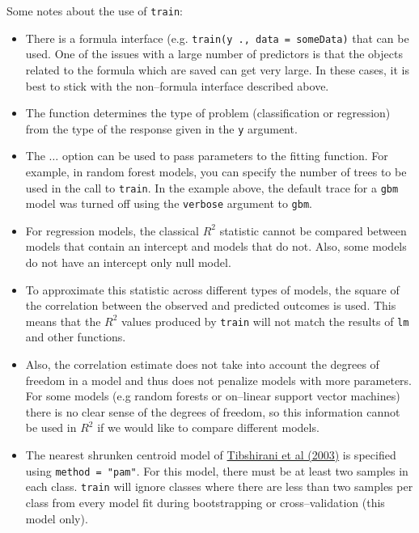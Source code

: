 \documentclass[12pt]{article}
\begin{document}
Some notes about the use of \texttt{train}:
\begin{itemize}
  
  \item There is a formula interface (e.g. \texttt{train(y~., data = someData)} that can be used. One of the issues with a large number of predictors is that the objects related to the formula which are saved can get very large. In these cases, it is best to stick with the non--formula interface described above.
	\item The function determines the type of problem (classification or regression) from the type of the response given in the \texttt{y} argument. 
	
	\item The \texttt{$\ldots$} option can be used to pass parameters to the fitting function. For example, in random forest models, you can specify the number of trees to be used in the call to \texttt{train}. In the example above, the default trace for a \texttt{gbm} model was turned off using the \texttt{verbose} argument to \texttt{gbm}.
	
	\item For regression models, the classical $R^2$ statistic cannot be compared between models that contain an intercept and models that do not. Also, some models do not have an intercept only null model.	
          
          \item [] To approximate this statistic across different types of models,  the square of the correlation between the observed and predicted outcomes is used. This means that the $R^2$ values produced by \texttt{train} will not match the results of \texttt{lm} and other functions. 
            
            \item [] Also, the correlation estimate does not take into account the degrees of freedom in a model and thus does not penalize models with more parameters. For some models (e.g random forests or on--linear support vector machines) there is no clear sense of the degrees of freedom, so this information cannot be used in $R^2$ if we would like to compare different models.
          
	
	\item The nearest shrunken centroid model of \href{http://projecteuclid.org/handle/euclid.ss/1056397488}{Tibshirani et al (2003)} is specified using \texttt{method = "pam"}. For this model, there must be at least two samples in each class. \texttt{train} will ignore classes where there are less than two samples per class from every model fit during bootstrapping or cross--validation (this model only).
	

\end{itemize}
\end{document}
